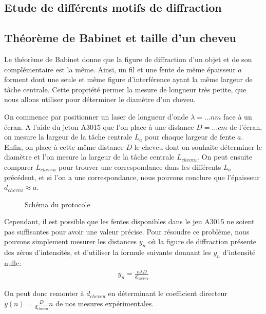 \documentclass[12pt]{article}
\begin{document}
\subsection{Etude de différents motifs de diffraction}

\break
\subsection{Théorème de Babinet et taille d'un cheveu}
Le théorème de Babinet donne que la figure de diffraction d'un objet et de son complémentaire est la même.
Ainsi, un fil et une fente de même épaisseur $a$ forment dont une seule et même figure d'interférence ayant la même largeur de tâche centrale. Cette propriété permet la mesure de longueur très petite, que nous allons utiliser
pour déterminer le diamètre d'un cheveu.

On commence par positionner un laser de longueur d'onde $\lambda = \dots nm$ face à un écran. A l'aide du jeton A3015 que l'on place à une distance $D = \dots cm$ de
l'écran, on mesure la largeur de la tâche centrale $L_a$ pour chaque largeur de fente $a$. Enfin, on place à cette même distance $D$ le cheveu dont on souhaite déterminer
le diamètre et l'on mesure la largeur de la tâche centrale $L_{cheveu}$. On peut ensuite comparer $L_{cheveu}$ pour trouver une correspondance dans les différents $L_a$ précédent, et si l'on a une 
correspondance, nous pouvons conclure que l'épaisseur $d_{cheveu} \approx a$.

\begin{figure}[!h]
    \begin{center}
        \resizebox{0.7\textwidth}{8cm}{
        
        }
    \end{center}
    \caption{Schéma du protocole}
\end{figure}

Cependant, il est possible que les fentes disponibles dans le jeu A3015 ne soient pas suffisantes pour avoir une valeur précise. Pour résoudre ce problème, nous pouvons
simplement mesurer les distances $y_n$ où la figure de diffraction présente des zéros d'intensités, et d'utiliser la formule suivante donnant les $y_n$ d'intensité nulle:
\begin{align}
    y_n = \frac{n\lambda D}{d_{cheveu}}
\end{align}

On peut donc remonter à $d_{cheveu}$ en déterminant le coefficient directeur $y(n) = \frac{D}{d_{cheveu}} n$ de nos mesures expérimentales.
\end{document}
